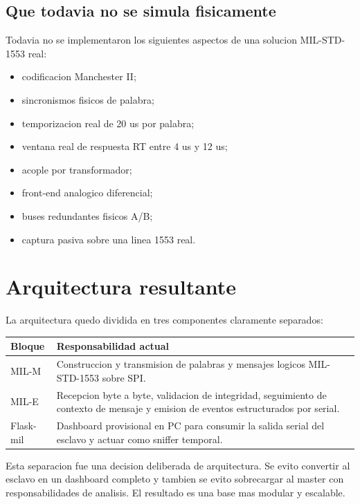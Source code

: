 \documentclass[12pt,a4paper]{article}
\begin{document}
\subsection{Que todavia no se simula fisicamente}

Todavia no se implementaron los siguientes aspectos de una solucion MIL-STD-1553 real:

\begin{itemize}
    \item codificacion Manchester II;
    \item sincronismos fisicos de palabra;
    \item temporizacion real de 20 us por palabra;
    \item ventana real de respuesta RT entre 4 us y 12 us;
    \item acople por transformador;
    \item front-end analogico diferencial;
    \item buses redundantes fisicos A/B;
    \item captura pasiva sobre una linea 1553 real.
\end{itemize}

\section{Arquitectura resultante}

La arquitectura quedo dividida en tres componentes claramente separados:

\begin{longtable}{|>{\raggedright\arraybackslash}p{3cm}|>{\raggedright\arraybackslash}p{10.8cm}|}
\hline
\textbf{Bloque} & \textbf{Responsabilidad actual} \\
\hline
MIL-M & Construccion y transmision de palabras y mensajes logicos MIL-STD-1553 sobre SPI. \\
\hline
MIL-E & Recepcion byte a byte, validacion de integridad, seguimiento de contexto de mensaje y emision de eventos estructurados por serial. \\
\hline
Flask-mil & Dashboard provisional en PC para consumir la salida serial del esclavo y actuar como sniffer temporal. \\
\hline
\end{longtable}

Esta separacion fue una decision deliberada de arquitectura. Se evito convertir al esclavo en un
dashboard completo y tambien se evito sobrecargar al master con responsabilidades de analisis.
El resultado es una base mas modular y escalable.
\end{document}
